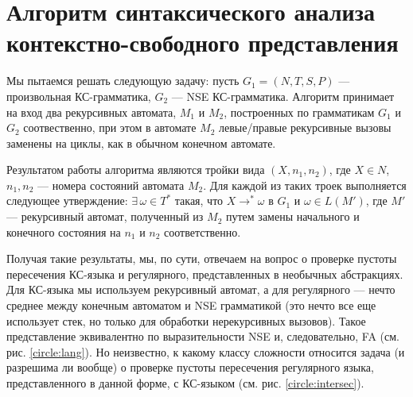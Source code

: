 \section{Алгоритм синтаксического анализа \\ контекстно-свободного представления}

Мы пытаемся решать следующую задачу: пусть $G_1 = (N, T, S, P)$ --- произвольная КС-грамматика, $G_2$ --- NSE КС-грамматика. Алгоритм принимает на вход два рекурсивных автомата, $M_1$ и $M_2$, построенных по грамматикам $G_1$ и $G_2$ соотвественно, при этом в автомате $M_2$ левые/правые рекурсивные вызовы заменены на циклы, как в обычном конечном автомате.

Результатом работы алгоритма являются тройки вида $(X, n_1, n_2)$, где $X \in N$, $n_1, n_2$ --- номера состояний автомата $M_2$. 
Для каждой из таких троек выполняется следующее утверждение: $\exists \, \omega \in T^*$ такая, что $X \rightarrow^* \omega$ в $G_1$ и $\omega \in L(M')$, где $M'$ --- рекурсивный автомат, полученный из $M_2$ путем замены начального и конечного состояния на $n_1$ и $n_2$ соответственно.

Получая такие результаты, мы, по сути, отвечаем на вопрос о проверке пустоты пересечения КС-языка и регулярного, представленных в необычных абстракциях. 
Для КС-языка мы используем рекурсивный автомат, а для регулярного --- нечто среднее между конечным автоматом и NSE грамматикой (это нечто все еще использует стек, но только для обработки нерекурсивных вызовов). 
Такое представление эквивалентно по выразительности NSE и, следовательно, FA (см. рис. \ref{circle:lang}). 
Но неизвестно, к какому классу сложности относится задача (и разрешима ли вообще) о проверке пустоты пересечения регулярного языка, представленного в данной форме, с КС-языком (см. рис. \ref{circle:intersec}).

